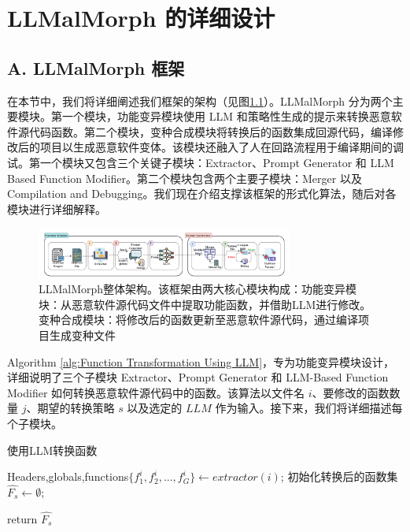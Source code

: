 \chapter{LLMalMorph 的详细设计}

\section{A. LLMalMorph 框架}

在本节中，我们将详细阐述我们框架的架构（见图\ref{fig:4.1}）。LLMalMorph 分为两个主要模块。第一个模块，功能变异模块使用 LLM 和策略性生成的提示来转换恶意软件源代码函数。第二个模块，变种合成模块将转换后的函数集成回源代码，编译修改后的项目以生成恶意软件变体。该模块还融入了人在回路流程用于编译期间的调试。第一个模块又包含三个关键子模块：Extractor、Prompt Generator 和 LLM Based Function Modifier。第二个模块包含两个主要子模块：Merger 以及 Compilation and Debugging。我们现在介绍支撑该框架的形式化算法，随后对各模块进行详细解释。

\begin{figure}[htbp]
	\centering
	\includegraphics[width=0.75\textwidth]{figures/figure1.png}
	\caption{LLMalMorph整体架构。该框架由两大核心模块构成：功能变异模块：从恶意软件源代码文件中提取功能函数，并借助LLM进行修改。变种合成模块：将修改后的函数更新至恶意软件源代码，通过编译项目生成变种文件}\label{fig:4.1}
\end{figure}

Algorithm \ref{alg:Function Transformation Using LLM}，专为功能变异模块设计，详细说明了三个子模块 Extractor、Prompt Generator 和 LLM-Based Function Modifier 如何转换恶意软件源代码中的函数。该算法以文件名 $i$、要修改的函数数量 $j$、期望的转换策略 $s$ 以及选定的 $LLM$ 作为输入。接下来，我们将详细描述每个子模块。

\begin{algorithm}[htbp]
	\caption{使用LLM转换函数\label{alg:Function Transformation Using LLM}}

    Headers,globals,functions$\{f_{1}^{i},f_{2}^{i},...,f_{G}^{i}\}\leftarrow extractor(i)$;
    初始化转换后的函数集 $\hat{F_{s}}\leftarrow \emptyset$;

    return $\hat{F_{s}}$
\end{algorithm}

